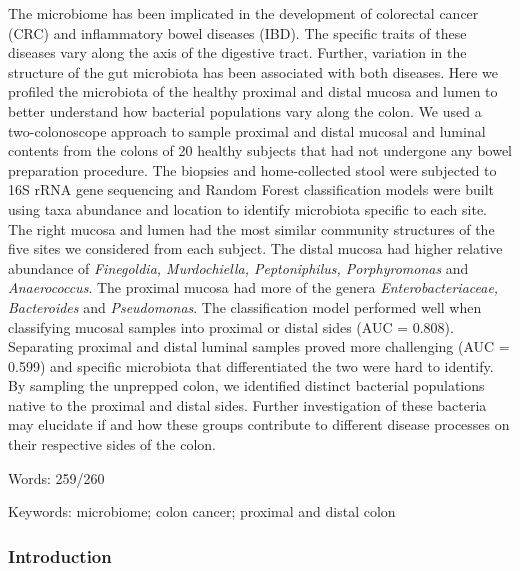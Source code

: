 \documentclass[12pt,]{article}
\begin{document}
The microbiome has been implicated in the development of colorectal
cancer (CRC) and inflammatory bowel diseases (IBD). The specific traits
of these diseases vary along the axis of the digestive tract. Further,
variation in the structure of the gut microbiota has been associated
with both diseases. Here we profiled the microbiota of the healthy
proximal and distal mucosa and lumen to better understand how bacterial
populations vary along the colon. We used a two-colonoscope approach to
sample proximal and distal mucosal and luminal contents from the colons
of 20 healthy subjects that had not undergone any bowel preparation
procedure. The biopsies and home-collected stool were subjected to 16S
rRNA gene sequencing and Random Forest classification models were built
using taxa abundance and location to identify microbiota specific to
each site. The right mucosa and lumen had the most similar community
structures of the five sites we considered from each subject. The distal
mucosa had higher relative abundance of \emph{Finegoldia, Murdochiella,
Peptoniphilus, Porphyromonas} and \emph{Anaerococcus}. The proximal
mucosa had more of the genera \emph{Enterobacteriaceae, Bacteroides} and
\emph{Pseudomonas}. The classification model performed well when
classifying mucosal samples into proximal or distal sides (AUC = 0.808).
Separating proximal and distal luminal samples proved more challenging
(AUC = 0.599) and specific microbiota that differentiated the two were
hard to identify. By sampling the unprepped colon, we identified
distinct bacterial populations native to the proximal and distal sides.
Further investigation of these bacteria may elucidate if and how these
groups contribute to different disease processes on their respective
sides of the colon.

Words: 259/260

Keywords: microbiome; colon cancer; proximal and distal colon

\subsubsection{Introduction}\label{introduction}
\end{document}
